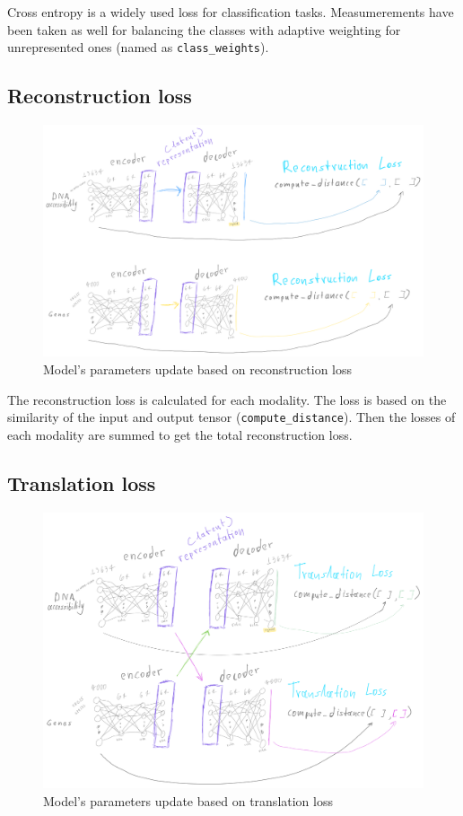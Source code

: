 \documentclass[12pt, a4paper]{article}
\begin{document}
Cross entropy is a widely used loss for classification tasks. Measumerements have been taken as well for balancing the classes with adaptive weighting for unrepresented ones (named as \verb|class_weights|).

\clearpage


\subsection{Reconstruction loss}

\begin{figure}[h!]
  \centering
  \includegraphics[width=\textwidth]{reconstruction_loss.png}
  \caption{Model's parameters update based on reconstruction loss}
\end{figure}


The reconstruction loss is calculated for each modality. The loss is based on the similarity of the input and output tensor (\verb|compute_distance|). Then the losses of each modality are summed to get the total reconstruction loss.


\clearpage

\subsection{Translation loss}

\begin{figure}[h!]
  \centering
  \includegraphics[width=\textwidth]{translation_loss.png}
  \caption{Model's parameters update based on translation loss}
\end{figure}
\end{document}
